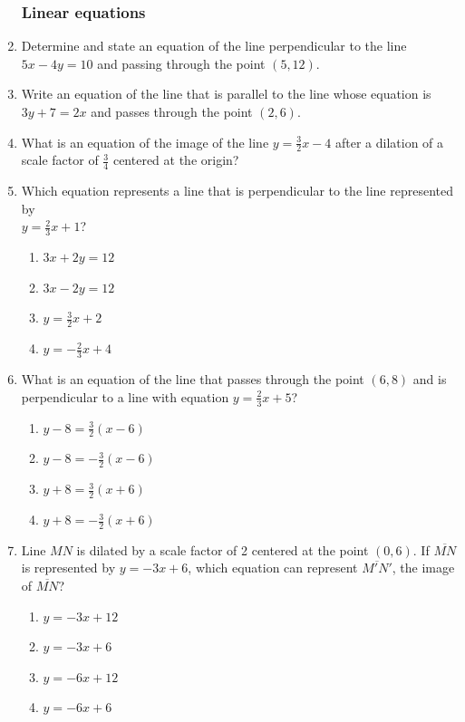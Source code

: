 \documentclass[12pt, oneside]{article}
\begin{document}
\begin{enumerate}[itemsep=0cm]
\newpage
\subsubsection*{Linear equations}
\item Determine and state an equation of the line perpendicular to the line\\ $5x-4y=10$ and passing through the point $(5,12)$.

\item Write an equation of the line that is parallel to the line whose equation is $3y+7=2x$ and passes through the point $(2,6)$.

\item What is an equation of the image of the line $\displaystyle y=\frac{3}{2}x-4$ after a dilation of a scale factor of $\displaystyle \frac{3}{4}$ centered at the origin?

\item Which equation represents a line that is perpendicular to the line represented by\\[0.25cm] $\displaystyle y=\frac{2}{3}x+1$?
  \begin{multicols}{2}
    \begin{enumerate}
      \item $3x+2y=12$
      \item $3x-2y=12$ 
      \item $\displaystyle y=\frac{3}{2}x+2$
      \item $\displaystyle y=-\frac{2}{3}x+4$
    \end{enumerate}
  \end{multicols}

\item What is an equation of the line that passes through the point $(6,8)$ and is perpendicular to a line with equation $y=\frac{2}{3}x+5$?
  \begin{multicols}{2}
    \begin{enumerate}
      \item $y-8=\frac{3}{2}(x-6)$
      \item $y-8=-\frac{3}{2}(x-6)$ 
      \item $y+8=\frac{3}{2}(x+6)$
      \item $y+8=-\frac{3}{2}(x+6)$
    \end{enumerate}
  \end{multicols}

\item Line $MN$ is dilated by a scale factor of 2 centered at the point $(0,6)$. If $\overline{MN}$ is represented by $y=-3x+6$, which equation can represent $\overline{M'N'}$, the image of $\overline{MN}$?
  \begin{multicols}{2}
    \begin{enumerate}
      \item $y=-3x+12$
      \item $y=-3x+6$ 
      \item $y=-6x+12$
      \item $y=-6x+6$
    \end{enumerate}
  \end{multicols}


\end{enumerate}
\end{document}
